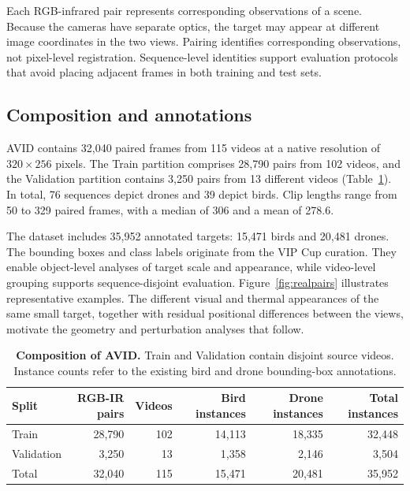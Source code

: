 \documentclass[10pt]{article}
\newcommand{\dataset}{\textsc{AVID}}
\begin{document}
Each RGB-infrared pair represents corresponding observations of a scene. Because the cameras have separate optics, the target may appear at different image coordinates in the two views. Pairing identifies corresponding observations, not pixel-level registration. Sequence-level identities support evaluation protocols that avoid placing adjacent frames in both training and test sets.

\subsection{Composition and annotations}

\dataset{} contains 32,040 paired frames from 115 videos at a native resolution of $320\times256$ pixels. The Train partition comprises 28,790 pairs from 102 videos, and the Validation partition contains 3,250 pairs from 13 different videos (Table~\ref{tab:corpus}). In total, 76 sequences depict drones and 39 depict birds. Clip lengths range from 50 to 329 paired frames, with a median of 306 and a mean of 278.6.

The dataset includes 35,952 annotated targets: 15,471 birds and 20,481 drones. The bounding boxes and class labels originate from the VIP Cup curation. They enable object-level analyses of target scale and appearance, while video-level grouping supports sequence-disjoint evaluation. Figure~\ref{fig:realpairs} illustrates representative examples. The different visual and thermal appearances of the same small target, together with residual positional differences between the views, motivate the geometry and perturbation analyses that follow.

\begin{table}[t]
\centering
\caption{\textbf{Composition of \dataset{}.}
Train and Validation contain disjoint source videos. Instance counts refer to the existing bird and drone bounding-box annotations.}
\label{tab:corpus}
\small
\begin{tabular}{lrrrrr}
\toprule
Split & RGB-IR pairs & Videos & Bird instances & Drone instances & Total instances \\
\midrule
Train      & 28,790 & 102 & 14,113 & 18,335 & 32,448 \\
Validation & 3,250  & 13  & 1,358  & 2,146  & 3,504 \\
\midrule
Total      & 32,040 & 115 & 15,471 & 20,481 & 35,952 \\
\bottomrule
\end{tabular}
\end{table}
\end{document}
